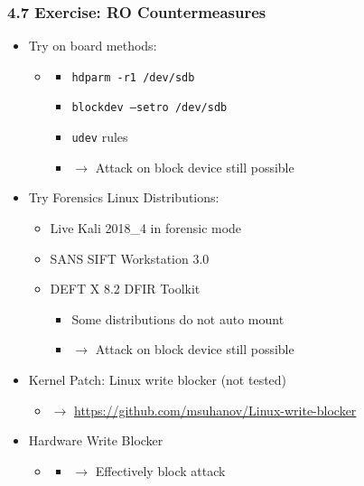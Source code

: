\begin{frame}
    \frametitle{4.7 Exercise: RO Countermeasures}
    \begin{itemize}
        \item Try on board methods:
        \begin{itemize}
            \item[]
            \begin{itemize}
                \item \texttt{hdparm -r1 /dev/sdb}
                \item \texttt{blockdev --setro /dev/sdb}
                \item \texttt{udev} rules
                \item[] $\to$ Attack on block device still possible
            \end{itemize}
        \end{itemize}
        \item Try Forensics Linux Distributions:
        \begin{itemize}
            \item Live Kali 2018\_4 in forensic mode
            \item SANS SIFT Workstation 3.0
            \item DEFT X 8.2 DFIR Toolkit
            \begin{itemize}
                \item Some distributions do not auto mount
                \item[] $\to$ Attack on block device still possible
            \end{itemize}
        \end{itemize}
\item Kernel Patch: Linux write blocker (not tested)
        \begin{itemize}
                \item[] $\to$ \url{https://github.com/msuhanov/Linux-write-blocker}
        \end{itemize}
        \item Hardware Write Blocker
        \begin{itemize}
            \item[]
            \begin{itemize}
                \item[] $\to$ Effectively block attack
            \end{itemize}
        \end{itemize}
    \end{itemize}
\end{frame}




